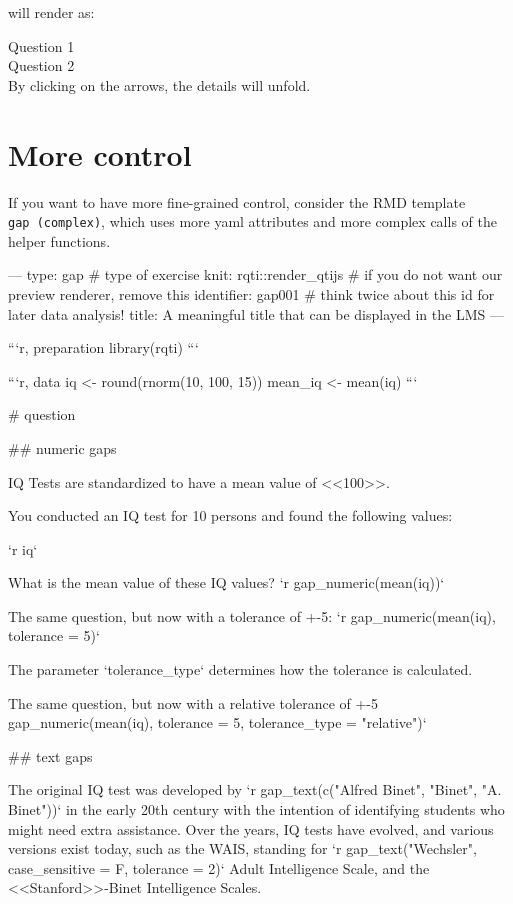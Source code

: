 \documentclass[twoside]{tufte-book}
\newenvironment{Shaded}{}{}
\begin{document}
will render as:

\noindent\textrightarrow{} Question 1\\
\noindent\textrightarrow{} Question 2\\

By clicking on the arrows, the details will unfold.

\section{More control}\label{more-control-2}

If you want to have more fine-grained control, consider the RMD template \texttt{gap\ (complex)}, which uses more yaml attributes and more complex calls of the helper functions.

\begin{Shaded}
\begin{Highlighting}
---
type: gap # type of exercise
knit: rqti::render_qtijs # if you do not want our preview renderer, remove this
identifier: gap001 # think twice about this id for later data analysis!
title: A meaningful title that can be displayed in the LMS
---

```{r, preparation}
library(rqti)
```

```{r, data}
iq <- round(rnorm(10, 100, 15))
mean_iq <- mean(iq)
```

# question

## numeric gaps

IQ Tests are standardized to have a mean value of <<100>>.

You conducted an IQ test for 10 persons and found the following values:

`r iq`

What is the mean value of these IQ values? `r gap_numeric(mean(iq))`

The same question, but now with a tolerance of +-5: `r gap_numeric(mean(iq),
tolerance = 5)`

The parameter `tolerance_type` determines how the tolerance is calculated.

The same question, but now with a relative tolerance of +-5%: `r
gap_numeric(mean(iq), tolerance = 5, tolerance_type = "relative")`

## text gaps

The original IQ test was developed by `r gap_text(c("Alfred Binet", "Binet", "A.
Binet"))` in the early 20th century with the intention of identifying students
who might need extra assistance. Over the years, IQ tests have evolved, and
various versions exist today, such as the WAIS, standing for `r
gap_text("Wechsler", case_sensitive = F, tolerance = 2)` Adult Intelligence
Scale, and the <<Stanford>>-Binet Intelligence Scales.


\end{Highlighting}
\end{Shaded}
\end{document}
